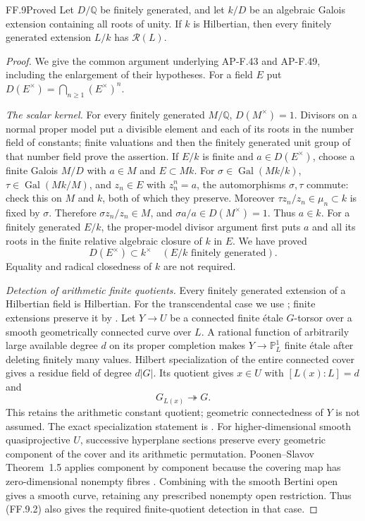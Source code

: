 \begin{claim}{FF.9}{Proved}\label{clm:FFcore}
Let \(D/\mathbb Q\) be finitely generated, and let \(k/D\) be
an algebraic Galois extension containing all roots of unity.
If \(k\) is Hilbertian, then every finitely generated extension
\(L/k\) has \(\mathcal R(L)\).
\end{claim}
\begin{proof}
We give the common argument underlying AP-F.43 and AP-F.49,
including the enlargement of their hypotheses. For a field \(E\)
put \(D(E^\times)=\bigcap_{n\ge1}(E^\times)^n\).

\emph{The scalar kernel.}
For every finitely generated \(M/\mathbb Q\),
\(D(M^\times)=1\). Divisors on a normal proper model put a
divisible element and each of its roots in the number field of
constants; finite valuations and then the finitely generated unit
group of that number field prove the assertion.
If \(E/k\) is finite and \(a\in D(E^\times)\), choose a finite
Galois \(M/D\) with \(a\in M\) and \(E\subset Mk\).
For \(\sigma\in\operatorname{Gal}(Mk/k)\),
\(\tau\in\operatorname{Gal}(Mk/M)\), and \(z_n\in E\) with
\(z_n^n=a\), the automorphisms \(\sigma,\tau\) commute: check
this on \(M\) and \(k\), both of which they preserve.
Moreover \(\tau z_n/z_n\in\mu_n\subset k\) is fixed by
\(\sigma\). Therefore \(\sigma z_n/z_n\in M\), and
\(\sigma a/a\in D(M^\times)=1\). Thus \(a\in k\).
For a finitely generated \(E/k\), the proper-model divisor
argument first puts \(a\) and all its roots in the finite relative
algebraic closure of \(k\) in \(E\). We have proved
\[
             D(E^\times)\subset k^\times
             \quad(E/k\text{ finitely generated}).       \tag{FF.9.1}
\]
Equality and radical closedness of \(k\) are not required.

\emph{Detection of arithmetic finite quotients.}
Every finitely generated extension of a Hilbertian field is
Hilbertian. For the transcendental case we use
\citet[Theorem~1.2, Corollary~3.2]{FF_BarySorokerParan2013};
finite extensions preserve it by
\citet[Corollary~3.2.2]{FF_Serre2007}. Let \(Y\to U\) be a
connected finite \'etale \(G\)-torsor over a smooth geometrically
connected curve over \(L\). A rational function of arbitrarily
large available degree \(d\) on its proper completion makes
\(Y\to\mathbb P^1_L\) finite \'etale after deleting finitely
many values. Hilbert specialization of the entire connected cover
gives a residue field of degree \(d|G|\). Its quotient gives
\(x\in U\) with \([L(x):L]=d\) and
\[
                         G_{L(x)}\twoheadrightarrow G.   \tag{FF.9.2}
\]
This retains the arithmetic constant quotient; geometric
connectedness of \(Y\) is not assumed. The exact specialization
statement is \citet[Proposition~3.3.1]{FF_Serre2007}.
For higher-dimensional smooth quasiprojective \(U\), successive
hyperplane sections preserve every geometric component of the
cover and its arithmetic permutation. Poonen--Slavov Theorem~1.5
applies component by component because the covering map has
zero-dimensional nonempty fibres \citep{FF_PoonenSlavov2020}.
Combining with the smooth Bertini open gives a smooth curve,
retaining any prescribed nonempty open restriction. Thus (FF.9.2)
also gives the required finite-quotient detection in that case.


\end{proof}
